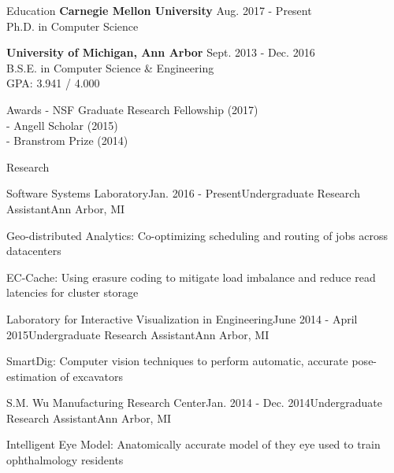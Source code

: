 \documentclass{resume} %
\begin{document}

\begin{rSection}{Education}
{\bf Carnegie Mellon University} \hfill {Aug. 2017 - Present} \\
Ph.D. in Computer Science

{\bf University of Michigan, Ann Arbor} \hfill {Sept. 2013 - Dec. 2016} \\ 
B.S.E. in Computer Science \& Engineering \\
GPA: 3.941 / 4.000

\end{rSection}

\begin{rSection}{Awards}
- NSF Graduate Research Fellowship (2017)\\
- Angell Scholar (2015)\\
- Branstrom Prize (2014)

\end{rSection}


\begin{rSection}{Research}

\begin{rSubsection}{Software Systems Laboratory}{Jan. 2016 - Present}{Undergraduate Research Assistant}{Ann Arbor, MI}
\item Geo-distributed Analytics: Co-optimizing scheduling and routing of jobs across datacenters
\item EC-Cache: Using erasure coding to mitigate load imbalance and reduce read latencies for cluster storage
\end{rSubsection}

\begin{rSubsection}{Laboratory for Interactive Visualization in Engineering}{June 2014 - April 2015}{Undergraduate Research Assistant}{Ann Arbor, MI}
\item SmartDig: Computer vision techniques to perform automatic, accurate pose-estimation of excavators
\end{rSubsection}

\begin{rSubsection}{S.M. Wu Manufacturing Research Center}{Jan. 2014 - Dec. 2014}{Undergraduate Research Assistant}{Ann Arbor, MI}
\item Intelligent Eye Model: Anatomically accurate model of they eye used to train ophthalmology residents
\end{rSubsection}
\end{rSection}
\end{document}

